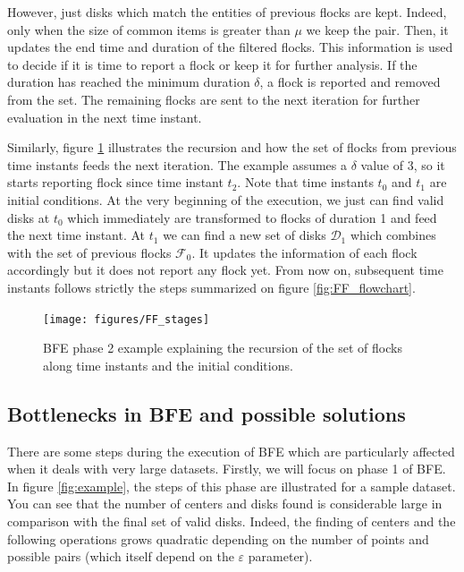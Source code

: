 However, just disks which match the entities of previous flocks are kept.  Indeed, only when the size of common items is greater than $\mu$ we keep the pair.  Then, it updates the end time and duration of the filtered flocks.  This information is used to decide if it is time to report a flock or keep it for further analysis.  If the duration has reached the minimum duration $\delta$, a flock is reported and removed from the set.  The remaining flocks are sent to the next iteration for further evaluation in the next time instant.

Similarly, figure \ref{fig:FF_stages} illustrates the recursion and how the set of flocks from previous time instants feeds the next iteration.  The example assumes a $\delta$ value of 3, so it starts reporting flock since time instant $t_2$.  Note that time instants $t_0$ and $t_1$ are initial conditions.  At the very beginning of the execution, we just can find valid disks at $t_0$ which immediately are transformed to flocks of duration 1 and feed the next time instant.  At $t_1$ we can find a new set of disks $\mathcal{D}_1$ which combines with the set of previous flocks $\mathcal{F}_0$.  It updates the information of each flock accordingly but it does not report any flock yet.  From now on, subsequent time instants follows strictly the steps summarized on figure \ref{fig:FF_flowchart}.

\begin{figure}[!ht]
    \centering
    \texttt{[image: figures/FF\_stages]}
    \caption{BFE phase 2 example explaining the recursion of the set of flocks along time instants and the initial conditions.}\label{fig:FF_stages}
\end{figure}

\subsection{Bottlenecks in BFE and possible solutions}
There are some steps during the execution of BFE which are particularly affected when it deals with very large datasets.  Firstly, we will focus on phase 1 of BFE.  In figure \ref{fig:example}, the steps of this phase are illustrated for a sample dataset.  You can see that the number of centers and disks found is considerable large in comparison with the final set of valid disks.  Indeed, the finding of centers and the following operations grows quadratic depending on the number of points and possible pairs (which itself depend on the $\varepsilon$ parameter).   

